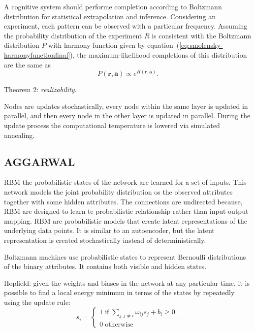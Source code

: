 A cognitive system should performe completion according to Boltzmann distribution for statistical extrapolation and inference.
Considering an experiment, each pattern can be observed with a particular frequency.
Assuming the probability distribution of the experiment $R$ is consistent with the Boltzmann distribution $P$ with harmony function given by equation~(\ref{eq:smolensky-harmonyfunctionfinal}), the maximum-likelihood completions of this distribution are the same as
\begin{equation}
    \label{eq:smolensky-teo1}
    P(\mathbf{r}, \mathbf{a}) \propto e^{H(\mathbf{r}, \mathbf{a})}.
\end{equation}

Theorem $2$: \textit{realizability}.

Nodes are updates stochastically, every node within the same layer is updated in parallel, and then every node in the other layer is updated in parallel.
During the update process the computational temperature is lowered via simulated annealing.


\subsection{AGGARWAL}

RBM\: the probabilistic states of the network are learned for a set of inputs.
This network models the joint probability distribution os the observed attributes together with some hidden attributes.
The connections are undirected because, RBM are designed to learn te probabilistic relationship rather than input-output mapping.
RBM are probabilistic models that create latent representations of the underlying data points.
It is similar to an autoencoder, but the latent representation is created stochastically instead of deterministically.

Boltzmann machines use probabilistic states to represent Bernoulli distributions of the binary attributes.
It contains both visible and hidden states.

Hopfield: given the weights and biases in the network at any particular time, it is possible to find a local energy minimum in terms of the states by repeatedly using the update rule:
\begin{equation}
    \label{eq:aggarwal-hopfield-update}
    s_{i} =
    \begin{cases}
         1 \; \text{if} \; \sum_{j : j \ne i} \omega_{ij} s_{j} + b_{i} \geq 0 \\
         0 \; \text{otherwise}
     \end{cases}.
\end{equation}

